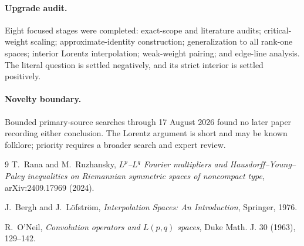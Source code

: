 \documentclass[10pt,a4paper]{article}
\begin{document}
\paragraph{Upgrade audit.}
Eight focused stages were completed: exact-scope and literature audits;
critical-weight scaling; approximate-identity construction; generalization
to all rank-one spaces; interior Lorentz interpolation; weak-weight pairing;
and edge-line analysis.  The literal question is settled negatively, and its
strict interior is settled positively.

\paragraph{Novelty boundary.}
Bounded primary-source searches through 17 August 2026 found no later paper
recording either conclusion.  The Lorentz argument is short and may be known
folklore; priority requires a broader search and expert review.

\begin{thebibliography}{9}\small
{}
T.~Rana and M.~Ruzhansky,
\emph{$L^p$--$L^q$ Fourier multipliers and Hausdorff--Young--Paley
inequalities on Riemannian symmetric spaces of noncompact type},
arXiv:2409.17969 (2024).

J.~Bergh and J.~L\"ofstr\"om,
\emph{Interpolation Spaces: An Introduction}, Springer, 1976.

R.~O'Neil,
\emph{Convolution operators and $L(p,q)$ spaces},
Duke Math. J. 30 (1963), 129--142.
\end{thebibliography}
\end{document}
